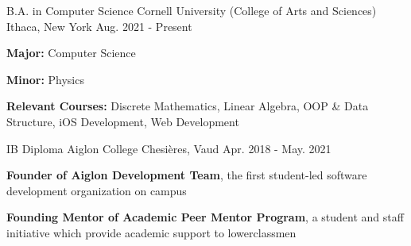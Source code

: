 \begin{cventries}
  \cventry
    {B.A. in Computer Science}
    {Cornell University (College of Arts and Sciences)}
    {Ithaca, New York}
    {Aug. 2021 - Present}
    {
      \begin{cvitems}
      	\item {\textbf{Major:} Computer Science}
        \item {\textbf{Minor:} Physics}
        \item {\textbf{Relevant Courses:} Discrete Mathematics, Linear Algebra, OOP \& Data Structure, iOS Development, Web Development}
      \end{cvitems}
    }

\cventry
    {IB Diploma}
    {Aiglon College}
    {Chesières, Vaud}
    {Apr. 2018 - May. 2021}
    {
      \begin{cvitems}
        \item {\textbf{Founder of Aiglon Development Team}, the first student-led software development organization on campus}
        \item {\textbf{Founding Mentor of Academic Peer Mentor Program}, a student and staff initiative which provide academic support to lowerclassmen}
      \end{cvitems}
    }
\end{cventries}
